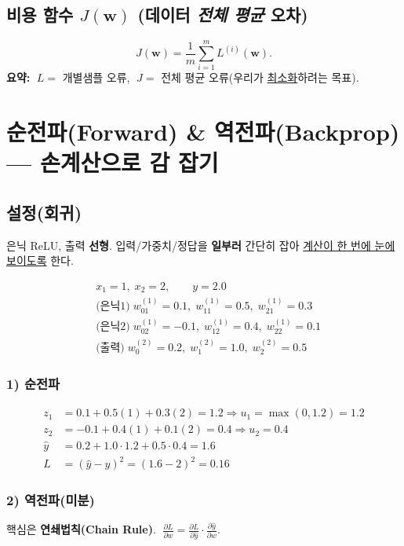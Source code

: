 \documentclass[12pt]{article}
\begin{document}
\subsection{비용 함수 $J(\bm w)$ (데이터 \emph{전체 평균} 오차)}
\[
J(\bm w) = \frac{1}{m}\sum_{i=1}^m L^{(i)}(\bm w).
\]
\textbf{요약:} \(\;L=\) 개별샘플 오류, \(\;J=\) 전체 평균 오류(우리가 \underline{최소화}하려는 목표).

\section{순전파(Forward) \& 역전파(Backprop) — 손계산으로 감 잡기}
\subsection{설정(회귀)}
은닉 ReLU, 출력 \textbf{선형}. 입력/가중치/정답을 \textbf{일부러} 간단히 잡아 \underline{계산이 한 번에 눈에 보이도록} 한다.

\[
\begin{aligned}
&x_1=1,\; x_2=2,\qquad y=2.0 \\
&\text{(은닉1)}\; w^{(1)}_{01}=0.1,\; w^{(1)}_{11}=0.5,\; w^{(1)}_{21}=0.3 \\
&\text{(은닉2)}\; w^{(1)}_{02}=-0.1,\; w^{(1)}_{12}=0.4,\; w^{(1)}_{22}=0.1 \\
&\text{(출력)}\; w^{(2)}_0=0.2,\; w^{(2)}_1=1.0,\; w^{(2)}_2=0.5
\end{aligned}
\]

\subsubsection*{1) 순전파}
\[
\begin{aligned}
z_1 &= 0.1 + 0.5(1) + 0.3(2) = 1.2 \Rightarrow u_1=\max(0,1.2)=1.2\\
z_2 &= -0.1 + 0.4(1) + 0.1(2)=0.4 \Rightarrow u_2=0.4\\
\hat{y} &= 0.2 + 1.0\cdot 1.2 + 0.5\cdot 0.4 = 1.6\\
L &= (\hat{y}-y)^2 = (1.6-2)^2 = 0.16
\end{aligned}
\]

\subsubsection*{2) 역전파(미분)}
핵심은 \textbf{연쇄법칙(Chain Rule)}. \(\; \frac{\partial L}{\partial w}=\frac{\partial L}{\partial \hat{y}}\cdot \frac{\partial \hat{y}}{\partial w}\).
\end{document}
